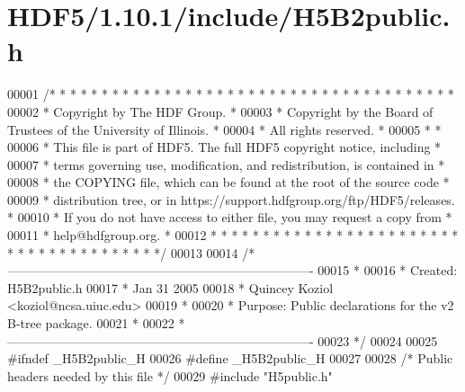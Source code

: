 \hypertarget{_h_d_f5_21_810_81_2include_2_h5_b2public_8h_source}{}\section{H\+D\+F5/1.10.1/include/\+H5\+B2public.h}
\label{_h_d_f5_21_810_81_2include_2_h5_b2public_8h_source}

\begin{DoxyCode}
00001 \textcolor{comment}{/* * * * * * * * * * * * * * * * * * * * * * * * * * * * * * * * * * * * * * *}
00002 \textcolor{comment}{ * Copyright by The HDF Group.                                               *}
00003 \textcolor{comment}{ * Copyright by the Board of Trustees of the University of Illinois.         *}
00004 \textcolor{comment}{ * All rights reserved.                                                      *}
00005 \textcolor{comment}{ *                                                                           *}
00006 \textcolor{comment}{ * This file is part of HDF5.  The full HDF5 copyright notice, including     *}
00007 \textcolor{comment}{ * terms governing use, modification, and redistribution, is contained in    *}
00008 \textcolor{comment}{ * the COPYING file, which can be found at the root of the source code       *}
00009 \textcolor{comment}{ * distribution tree, or in https://support.hdfgroup.org/ftp/HDF5/releases.  *}
00010 \textcolor{comment}{ * If you do not have access to either file, you may request a copy from     *}
00011 \textcolor{comment}{ * help@hdfgroup.org.                                                        *}
00012 \textcolor{comment}{ * * * * * * * * * * * * * * * * * * * * * * * * * * * * * * * * * * * * * * */}
00013 
00014 \textcolor{comment}{/*-------------------------------------------------------------------------}
00015 \textcolor{comment}{ *}
00016 \textcolor{comment}{ * Created:             H5B2public.h}
00017 \textcolor{comment}{ *                      Jan 31 2005}
00018 \textcolor{comment}{ *                      Quincey Koziol <koziol@ncsa.uiuc.edu>}
00019 \textcolor{comment}{ *}
00020 \textcolor{comment}{ * Purpose:             Public declarations for the v2 B-tree package.}
00021 \textcolor{comment}{ *}
00022 \textcolor{comment}{ *-------------------------------------------------------------------------}
00023 \textcolor{comment}{ */}
00024 
00025 \textcolor{preprocessor}{#ifndef \_H5B2public\_H}
00026 \textcolor{preprocessor}{#define \_H5B2public\_H}
00027 
00028 \textcolor{comment}{/* Public headers needed by this file */}
00029 \textcolor{preprocessor}{#include "H5public.h"}

\end{DoxyCode}
